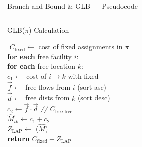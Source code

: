 \documentclass[aspectratio=169,11pt]{beamer}
\begin{document}
\begin{frame}{Branch-and-Bound \& GLB --- Pseudocode}
\begin{columns}[T]
\begin{block}{GLB($\pi$) Calculation}
\footnotesize
\vspace{-2pt}
\begin{tabbing}
\hspace{3mm}\=\hspace{3mm}\=\hspace{3mm}\=\hspace{3mm}\=\kill
$C_{\text{fixed}} \leftarrow$ cost of fixed assignments in $\pi$\\[2pt]
\textbf{for each} free facility $i$:\\
\> \textbf{for each} free location $k$:\\
\>\> $c_1 \leftarrow$ cost of $i\!\to\!k$ with fixed\\
\>\> $\vec{f} \leftarrow$ free flows from $i$ (sort asc)\\
\>\> $\vec{d} \leftarrow$ free dists from $k$ (sort desc)\\
\>\> $c_2 \leftarrow \vec{f} \cdot \vec{d}$ \hfill\textit{// $C_{\text{free-free}}$}\\
\>\> $\hat{M}_{ik} \leftarrow c_1 + c_2$\\[2pt]
$Z_{\text{LAP}} \leftarrow$ ($\hat{M}$)\\[2pt]
\textbf{return} $C_{\text{fixed}} + Z_{\text{LAP}}$
\end{tabbing}
\vspace{-4pt}
\end{block}

\end{columns}
\end{frame}
\end{document}
